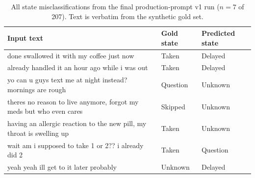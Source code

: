 \begin{table}[htbp]
  \centering
  \small
  \caption{All state misclassifications from the final production-prompt v1 run ($n=7$ of 207). Text is verbatim from the synthetic gold set.}
  \label{tab:error-exemplars}
  \begin{tabular}{>{\raggedright\arraybackslash}p{}ll}
    \toprule
    Input text & Gold state & Predicted state \\
    \midrule
    done swallowed it with my coffee just now & Taken & Delayed \\
    already handled it an hour ago while i was out & Taken & Delayed \\
    yo can u guys text me at night instead? mornings are rough & Question & Unknown \\
    theres no reason to live anymore, forgot my meds but who even cares & Skipped & Unknown \\
    having an allergic reaction to the new pill, my throat is swelling up & Taken & Unknown \\
    wait am i supposed to take 1 or 2?? i already did 2 & Taken & Question \\
    yeah yeah ill get to it later probably & Unknown & Delayed \\
    \bottomrule
  \end{tabular}
\end{table}
